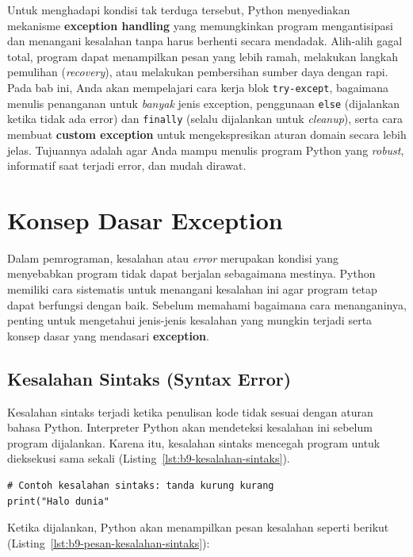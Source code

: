 Untuk menghadapi kondisi tak terduga tersebut, Python menyediakan mekanisme \textbf{exception handling} yang memungkinkan program mengantisipasi dan menangani kesalahan tanpa harus berhenti secara mendadak. Alih-alih gagal total, program dapat menampilkan pesan yang lebih ramah, melakukan langkah pemulihan (\textit{recovery}), atau melakukan pembersihan sumber daya dengan rapi. Pada bab ini, Anda akan mempelajari cara kerja blok \texttt{try-except}, bagaimana menulis penanganan untuk \textit{banyak} jenis exception, penggunaan \texttt{else} (dijalankan ketika tidak ada error) dan \texttt{finally} (selalu dijalankan untuk \textit{cleanup}), serta cara membuat \textbf{custom exception} untuk mengekspresikan aturan domain secara lebih jelas. Tujuannya adalah agar Anda mampu menulis program Python yang \textit{robust}, informatif saat terjadi error, dan mudah dirawat.


\section{Konsep Dasar Exception}

Dalam pemrograman, kesalahan atau \textit{error} merupakan kondisi yang menyebabkan program tidak dapat berjalan sebagaimana mestinya. Python memiliki cara sistematis untuk menangani kesalahan ini agar program tetap dapat berfungsi dengan baik. Sebelum memahami bagaimana cara menanganinya, penting untuk mengetahui jenis-jenis kesalahan yang mungkin terjadi serta konsep dasar yang mendasari \textbf{exception}.

\subsection*{Kesalahan Sintaks (Syntax Error)}

Kesalahan sintaks terjadi ketika penulisan kode tidak sesuai dengan aturan bahasa Python. Interpreter Python akan mendeteksi kesalahan ini sebelum program dijalankan. Karena itu, kesalahan sintaks mencegah program untuk dieksekusi sama sekali (Listing~\ref{lst:b9-kesalahan-sintaks}).

\begin{lstlisting}[style=PythonStyle, caption={Contoh kesalahan sintaks}, label={lst:b9-kesalahan-sintaks}]
# Contoh kesalahan sintaks: tanda kurung kurang
print("Halo dunia"
\end{lstlisting}

Ketika dijalankan, Python akan menampilkan pesan kesalahan seperti berikut (Listing~\ref{lst:b9-pesan-kesalahan-sintaks}):

